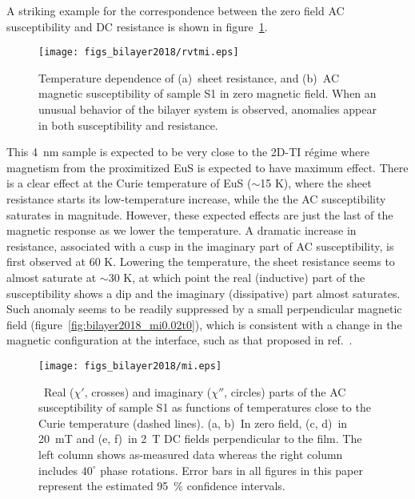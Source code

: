 A striking example for the correspondence between the zero field AC susceptibility and DC resistance is shown in figure~\ref{fig:bilayer2018_mirvt}. %
 \begin{figure}[ht]%
	\centering%
    \subfloat{\label{fig:bilayer2018_s1rvt}}%
    \subfloat{\label{fig:bilayer2018_s1mi}}%
    \texttt{[image: figs\_bilayer2018/rvtmi.eps]}%
    \caption[Coincidental magnetic and resistive anomalies in a (Bi$_{x}$Sb$_{1-x}$)$_2$Te$_3$--EuS bilayer]{\label{fig:bilayer2018_mirvt}Temperature dependence of (a)~sheet resistance, and (b)~AC magnetic susceptibility of sample S1 in zero magnetic field. When an unusual behavior of the bilayer system is observed, anomalies appear in both susceptibility and resistance.}%
\end{figure}%
This 4~nm sample is expected to be very close to the 2D-TI r\'egime where magnetism from the proximitized EuS is expected to have maximum effect. There is a clear effect at the Curie temperature of EuS ($\sim$15 K), where the sheet resistance starts its low-temperature increase, while the the AC susceptibility saturates in magnitude. However, these expected effects are just the last of the magnetic response as we lower the temperature. A dramatic increase in resistance, associated with a cusp in the imaginary part of AC susceptibility, is first observed at 60 K. Lowering the temperature, the sheet resistance seems to almost saturate at $\sim$30 K, at which point the real (inductive) part of the susceptibility shows a dip and the imaginary (dissipative) part almost saturates. Such anomaly seems to be readily suppressed by a small perpendicular magnetic field (figure~\ref{fig:bilayer2018_mi0.02t0}), which is consistent with a change in the magnetic configuration at the interface, such as that proposed in ref.~\cite{Moodera2016}. %
\begin{figure}[ht]%
    \centering%
    \subfloat{\label{fig:bilayer2018_mi0t0}}%
    \subfloat{\label{fig:bilayer2018_mi0t40}}%
    \subfloat{\label{fig:bilayer2018_mi0.02t0}}%
    \subfloat{\label{fig:bilayer2018_mi0.02t40}}%
    \subfloat{\label{fig:bilayer2018_mi2t0}}%
    \subfloat{\label{fig:bilayer2018_mi2t40}}%
    \texttt{[image: figs\_bilayer2018/mi.eps]}%
    \caption[AC magnetic susceptibility of a (Bi$_{x}$Sb$_{1-x}$)$_2$Te$_3$--EuS bilayer in external DC fields.]{\label{fig:bilayer2018_mi}~Real ($\chi'$, crosses) and imaginary ($\chi''$, circles) parts of the AC susceptibility of sample S1 as functions of temperatures close to the Curie temperature (dashed lines). (a, b)~In zero field, (c, d)~in 20~mT and (e, f)~in 2~T DC fields perpendicular to the film. The left column shows as-measured data whereas the right column includes $40^{\circ}$ phase rotations. Error bars in all figures in this paper represent the estimated 95~\protect\% confidence intervals.}%
\end{figure}%
